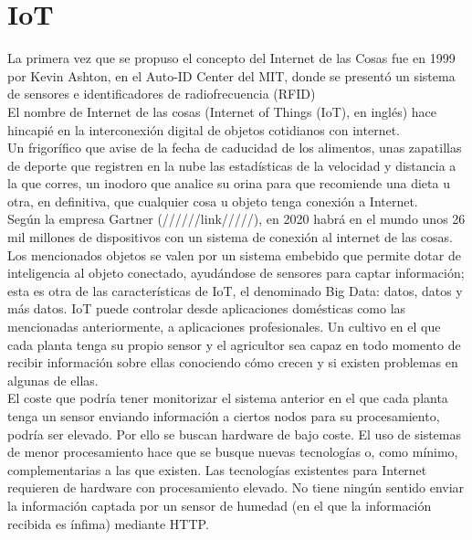 \documentclass[12pt, twoside]{book}
\begin{document}
\chapter{IoT}
La primera vez que se propuso el concepto del Internet de las Cosas fue en 1999 por Kevin Ashton, en el Auto-ID Center del MIT, donde se presentó un sistema de sensores e identificadores de radiofrecuencia (RFID)\\
El nombre de Internet de las cosas (Internet of Things (IoT), en inglés) hace hincapié en la interconexión digital de objetos cotidianos con internet.\\
Un frigorífico que avise de la fecha de caducidad de los alimentos, unas zapatillas de deporte que registren en la nube las estadísticas de la velocidad y distancia a la que corres, un inodoro que analice su orina para que recomiende una dieta u otra, en definitiva, que cualquier cosa u objeto tenga conexión a Internet. \\
Según la empresa Gartner (//////link/////), en 2020 habrá en el mundo unos 26 mil millones de dispositivos con un sistema de conexión al internet de las cosas. Los mencionados objetos se valen por un sistema embebido que permite dotar de inteligencia al objeto conectado, ayudándose de sensores para captar información; esta es otra de las características de IoT, el denominado Big Data: datos, datos y más datos.
IoT puede controlar desde aplicaciones domésticas como las mencionadas anteriormente, a aplicaciones profesionales. Un cultivo en el que cada planta tenga su propio sensor y el agricultor sea capaz en todo momento de recibir información sobre ellas conociendo cómo crecen y si existen problemas en algunas de ellas. \\
El coste que podría tener monitorizar el sistema anterior en el que cada planta tenga un sensor enviando información a ciertos nodos para su procesamiento, podría ser elevado. Por ello se buscan hardware de bajo coste. El uso de sistemas de menor procesamiento hace que se busque nuevas tecnologías o, como mínimo, complementarias a las que existen. Las tecnologías existentes para Internet requieren de hardware con procesamiento elevado. No tiene ningún sentido enviar la información captada por un sensor de humedad (en el que la información recibida es ínfima) mediante HTTP.\\
\end{document}
